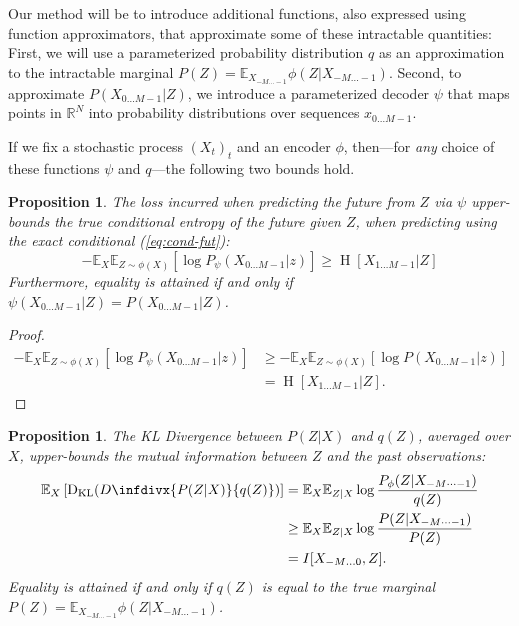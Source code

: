 \documentclass[11pt,letterpaper]{article}
\newcommand{\E}[0]{\mathbb{E}}
\newcounter{theorem}
\newtheorem{proposition}[theorem]{Proposition}
\newcommand{\infdiv}{D\infdivx}
\begin{document}
Our method will be to introduce additional functions, also expressed using function approximators, that approximate some of these intractable quantities:
First, we will use a parameterized probability distribution $q$ as an approximation to the intractable marginal $P(Z) = \E_{X_{-M \dots -1}} \phi(Z|X_{-M \dots -1})$.
Second, to approximate $P(X_{0\dots M-1}|Z)$, we introduce a parameterized decoder $\psi$ that maps points in $\mathbb{R}^N$  into probability distributions over sequences $x_{0\dots M-1}$.

If we fix a stochastic process $(X_t)_t$ and an encoder $\phi$, then---for \emph{any} choice of these functions $\psi$ and $q$---the following two bounds hold.

\begin{proposition}
The loss incurred when predicting the future from $Z$ via $\psi$ upper-bounds the true conditional entropy of the future given $Z$, when predicting using the exact conditional (\ref{eq:cond-fut}):
\begin{equation}\label{ineq1}
	-	\mathbb{E}_{X}\mathbb{E}_{Z \sim \phi(X)}\left[\log P_\psi(X_{0\dots M-1} | z)\right] \geq \operatorname{H}[X_{1\dots M-1}|Z]
\end{equation}
Furthermore, equality is attained if and only if $\psi(X_{0\dots M-1}|Z) = P(X_{0\dots M-1}|Z)$.
\end{proposition}

\begin{proof}
\begin{align*}
	-	\mathbb{E}_{X}\mathbb{E}_{Z \sim \phi(X)}\left[\log P_\psi(X_{0\dots M-1} | z)\right] & \geq -	\mathbb{E}_{X}\mathbb{E}_{Z \sim \phi(X)}\left[\log P(X_{0\dots M-1} | z)\right]\\
	&= \operatorname{H}[X_{1\dots M-1}|Z].
\end{align*}
\end{proof}

\begin{proposition} 
The KL Divergence between $P(Z|X)$ and $q(Z)$, averaged over $X$, upper-bounds the mutual information between $Z$ and the past observations:
\begin{equation}\label{ineq2}
\begin{aligned}
	\mathbb{E}_{X}\left[ \operatorname{D_{KL}}(\infdiv{P(Z|X)}{q(Z)})\right] &=   \mathbb{E}_{X} \mathbb{E}_{Z|X} \log \frac{P_\phi(Z|X_{-M\dots -1})}{q(Z)}  \\
	& \geq  \mathbb{E}_{X} \mathbb{E}_{Z|X} \log \frac{P(Z|X_{-M\dots -1})}{P(Z)}  \\
	& = I[X_{-M\dots 0},Z].
\end{aligned}
\end{equation}
Equality is attained if and only if $q(Z)$ is equal to the true marginal $P(Z) = \E_{X_{-M \dots -1}} \phi(Z|X_{-M \dots -1})$.
\end{proposition}
\end{document}
